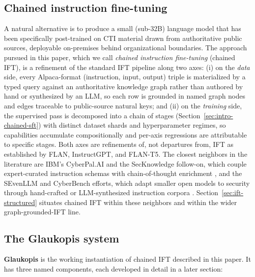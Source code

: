 \documentclass[conference]{IEEEtran}
\begin{document}
\subsection{Chained instruction fine-tuning}
\label{sec:intro-chained-instruction-fine-tuning}
A natural alternative is to produce a small (sub-32B) language model that has been specifically post-trained on CTI material drawn from authoritative public sources, deployable on-premises behind organizational boundaries. The approach pursued in this paper, which we call \textit{chained instruction fine-tuning} (chained IFT), is a refinement of the standard IFT pipeline \cite{wei2022flan,ouyang2022instructgpt,chung2022flant5} along two axes: (i) on the \emph{data} side, every Alpaca-format (instruction, input, output) triple is materialized by a typed query against an authoritative knowledge graph rather than authored by hand or synthesized by an LLM, so each row is grounded in named graph nodes and edges traceable to public-source natural keys; and (ii) on the \emph{training} side, the supervised pass is decomposed into a chain of stages (Section~\ref{sec:intro-chained-sft}) with distinct dataset shards and hyperparameter regimes, so capabilities accumulate compositionally and per-axis regressions are attributable to specific stages. Both axes are refinements of, not departures from, IFT as established by FLAN, InstructGPT, and FLAN-T5. The closest neighbors in the literature are IBM's CyberPal.AI and the SecKnowledge follow-on, which couple expert-curated instruction schemas with chain-of-thought enrichment \cite{levi2024cyberpal,levi2025toward}, and the SEvenLLM and CyberBench efforts, which adapt smaller open models to security through hand-crafted or LLM-synthesized instruction corpora \cite{ji2024sevenllm,liu2024cyberbench}. Section~\ref{sec:ift-structured} situates chained IFT within these neighbors and within the wider graph-grounded-IFT line.

\subsection{The Glaukopis system}
\label{sec:intro-the-glaukopis-system}
\textbf{Glaukopis} is the working instantiation of chained IFT described in this paper. It has three named components, each developed in detail in a later section:
\end{document}
